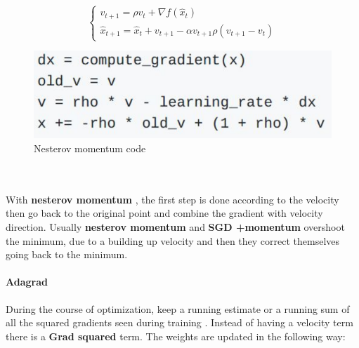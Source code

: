 \documentclass[11pt]{article}
\begin{document}
\begin{minipage}{0.5\textwidth}
\begin{equation}
\begin{cases}
v_{t+1}=\rho v_t+\nabla f(\hat{x}_t) \\
    \hat{x}_{t+1}=\hat{x}_t+v_{t+1} -\alpha v_{t+1} \rho (v_{t+1}-v_t)
    \end{cases}{}
\end{equation}{}
\end{minipage}
\begin{minipage}{0.5\textwidth}
\begin{figure} [H]
\centering 
\includegraphics[scale=0.46]{L614.pdf}
\caption{ Nesterov momentum code}
\label{fig:L614}
\end{figure}
\end{minipage}\\\\


With \textbf{nesterov momentum },  the first step is done  according to the  velocity then go back to the original point and combine the gradient with velocity direction.
Usually \textbf{nesterov momentum } and \textbf{SGD +momentum } overshoot the minimum, due to a building up velocity and then they correct themselves going back to the minimum.\\
\paragraph{Adagrad}
During the course of optimization, keep a running estimate or a running sum of all the squared gradients seen during training . Instead of having a velocity term there is a \textbf{Grad squared} term.
The weights are updated in the following way:
\end{document}
